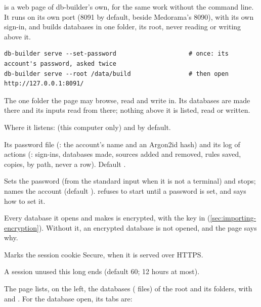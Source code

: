  is a web page of db-builder's own, for the same work without the command
line. It runs on its own port (8091 by default, beside Medorama's 8090), with its own sign-in,
and builds databases in one folder, its root, never reading or writing above it.
\begin{lstlisting}[style=shell]
db-builder serve --set-password                    # once: its account's password, asked twice
db-builder serve --root /data/build                # then open http://127.0.0.1:8091/
\end{lstlisting}
\begin{params}
\item[--root DIR] The one folder the page may browse, read and write in. Its databases are made
  there and its inputs read from there; nothing above it is listed, read or written.
\item[--host H, --port P] Where it listens:  (this computer only) and
   by default.
\item[--home DIR] Its password file (: the account's name and an Argon2id hash)
  and its log of actions (: sign-ins, databases made, sources added and
  removed, rules saved, copies, by path, never a row). Default .
\item[--set-password] Sets the password (from the standard input when it is not a terminal) and
  stops;  names the account (default ).  refuses to
  start until a password is set, and says how to set it.
\item[--encrypt] Every database it opens and makes is encrypted, with the key in
   (\cref{sec:importing-encryption}). Without it, an encrypted database
  is not opened, and the page says why.
\item[--secure-cookies] Marks the session cookie Secure, when it is served over HTTPS.
\item[--idle-minutes N] A session unused this long ends (default 60; 12 hours at most).
\end{params}
The page lists, on the left, the databases ( files) of the root and its folders,
with  and . For the database open, its tabs are:
